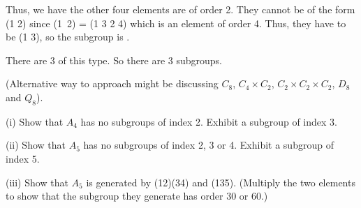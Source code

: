 \begin{solution}[\bf Solution.]
Thus, we have the other four elements are of order 2. They cannot be of the form (1 2) since
\be
(1\ 2) = (1 3 2 4)
\ee
which is an element of order 4. Thus, they have to be (1 3), so the subgroup is
\be
{}.
\ee

There are 3 of this type. So there are 3 subgroups.

(Alternative way to approach might be discussing $C_8$, $C_4\times C_2$, $C_2 \times C_2 \times C_2$, $D_8$ and $Q_8$).
\een
\end{solution}



\begin{problem}
\ben
\item [(i)] Show that $A_4$ has no subgroups of index 2. Exhibit a subgroup of index 3.
\item [(ii)] Show that $A_5$ has no subgroups of index 2, 3 or 4. Exhibit a subgroup of index 5.
\item [(iii)] Show that $A_5$ is generated by (12)(34) and (135). (Multiply the two elements to show that the subgroup they generate has order 30 or 60.)
\een
\end{problem}


